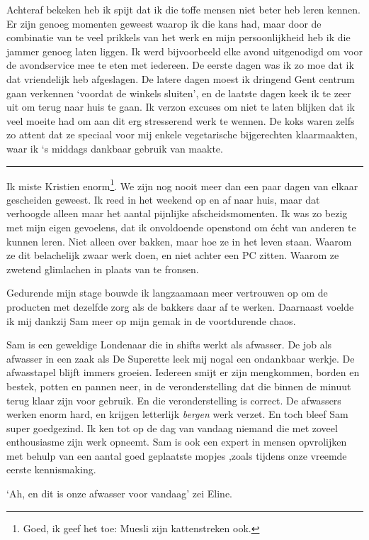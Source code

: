 \documentclass[
  11pt,
  dutch,
]{memoir}
\begin{document}
Achteraf bekeken heb ik spijt dat ik die toffe mensen niet beter heb
leren kennen. Er zijn genoeg momenten geweest waarop ik die kans had,
maar door de combinatie van te veel prikkels van het werk en mijn
persoonlijkheid heb ik die jammer genoeg laten liggen. Ik werd
bijvoorbeeld elke avond uitgenodigd om voor de avondservice mee te eten
met iedereen. De eerste dagen was ik zo moe dat ik dat vriendelijk heb
afgeslagen. De latere dagen moest ik dringend Gent centrum gaan
verkennen `voordat de winkels sluiten', en de laatste dagen keek ik te
zeer uit om terug naar huis te gaan. Ik verzon excuses om niet te laten
blijken dat ik veel moeite had om aan dit erg stresserend werk te
wennen. De koks waren zelfs zo attent dat ze speciaal voor mij enkele
vegetarische bijgerechten klaarmaakten, waar ik `s middags dankbaar
gebruik van maakte.

\pfbreak

Ik miste Kristien enorm\footnote{Goed, ik geef het toe: Muesli zijn
  kattenstreken ook.}. We zijn nog nooit meer dan een paar dagen van
elkaar gescheiden geweest. Ik reed in het weekend op en af naar huis,
maar dat verhoogde alleen maar het aantal pijnlijke afscheidsmomenten.
Ik was zo bezig met mijn eigen gevoelens, dat ik onvoldoende openstond
om écht van anderen te kunnen leren. Niet alleen over bakken, maar hoe
ze in het leven staan. Waarom ze dit belachelijk zwaar werk doen, en
niet achter een PC zitten. Waarom ze zwetend glimlachen in plaats van te
fronsen.

Gedurende mijn stage bouwde ik langzaamaan meer vertrouwen op om de
producten met dezelfde zorg als de bakkers daar af te werken. Daarnaast
voelde ik mij dankzij Sam meer op mijn gemak in de voortdurende chaos.

Sam is een geweldige Londenaar die in shifts werkt als afwasser. De job
als afwasser in een zaak als De Superette leek mij nogal een ondankbaar
werkje. De afwasstapel blijft immers groeien. Iedereen smijt er zijn
mengkommen, borden en bestek, potten en pannen neer, in de
veronderstelling dat die binnen de minuut terug klaar zijn voor gebruik.
En die veronderstelling is correct. De afwassers werken enorm hard, en
krijgen letterlijk \emph{bergen} werk verzet. En toch bleef Sam super
goedgezind. Ik ken tot op de dag van vandaag niemand die met zoveel
enthousiasme zijn werk opneemt. Sam is ook een expert in mensen
opvrolijken met behulp van een aantal goed geplaatste mopjes ,zoals
tijdens onze vreemde eerste kennismaking.

`Ah, en dit is onze afwasser voor vandaag' zei Eline.
\end{document}
